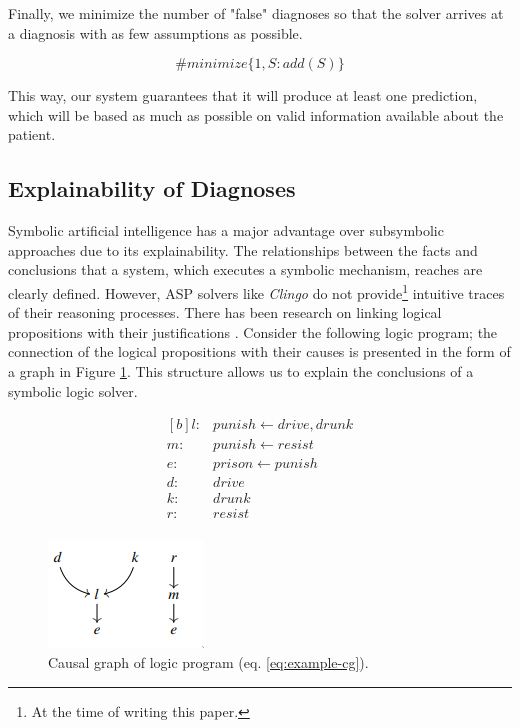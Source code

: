 \documentclass[10pt,leqno]{amsart}
\begin{document}
Finally, we minimize the number of "false" diagnoses so that the solver arrives at a diagnosis with as few assumptions as possible.

\begin{equation}
    \#minimize \{ 1, S : add(S) \}
\end{equation}

This way, our system guarantees that it will produce at least one prediction, which will be based as much as possible on valid information available about the patient.

\subsection{Explainability of Diagnoses}

Symbolic artificial intelligence has a major advantage over subsymbolic approaches due to its explainability. The relationships between the facts and conclusions that a system, which executes a symbolic mechanism, reaches are clearly defined. However, ASP solvers like \textit{Clingo} do not provide\footnote{At the time of writing this paper.} intuitive traces of their reasoning processes. There has been research on linking logical propositions with their justifications \cite{cabalar2014causal}. Consider the following logic program; the connection of the logical propositions with their causes is presented in the form of a graph in Figure \ref{fig:causal-g}. This structure allows us to explain the conclusions of a symbolic logic solver.

\begin{equation}
\begin{aligned}[b]
    l :& punish \longleftarrow drive, drunk \\
    m :& punish \longleftarrow resist \\
    e :& prison \longleftarrow punish \\
    d :& drive \\
    k :& drunk \\
    r :& resist \\
\end{aligned}
\label{eq:example-cg}
\end{equation}

\begin{figure}
    \centering
    \includegraphics{assets/causal_g.png}
    \caption{Causal graph of logic program (eq. \ref{eq:example-cg}).}
    \label{fig:causal-g}
\end{figure}
\end{document}
